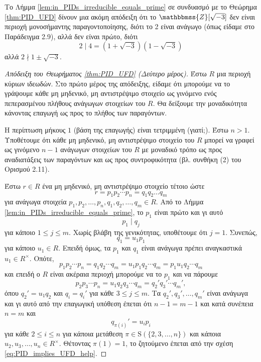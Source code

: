 \documentclass[12pt,a4paper,reqno]{amsart}
\theoremstyle{definition}
\theoremstyle{remark}
\numberwithin{theorem}{section}
\numberwithin{exercise}{section}
\numberwithin{equation}{section}
\newcommand{\ZZ}{\mathbbmss{Z}}
\newcommand{\rmS}{\mathrm{S}}
\begin{document}
Το Λήμμα \ref{lem:in_PIDs_irreducible_equals_prime} σε συνδυασμό με το Θεώρημα \ref{thm:PID_UFD} δίνουν μια ακόμη απόδειξη ότι το $\ZZ[\sqrt{-3}]$ δεν είναι περιοχή μονοσήμαντης παραγοντοποίησης, διότι το 2 είναι ανάγωγο (όπως είδαμε στο Παράδειγμα 2.9), αλλά δεν είναι πρώτο, διότι 
\[
2 \mid 4 = (1 + \sqrt{-3})(1 - \sqrt{-3})
\]
αλλά $2 \nmid 1 \pm \sqrt{-3}$.

\begin{proof}[Απόδειξη του Θεωρήματος \ref{thm:PID_UFD} (Δεύτερο μέρος)] 
    Έστω $R$ μια περιοχή κύριων ιδεωδών. Στο π\-ρώτο μέρος της απόδειξης, είδαμε ότι μπορούμε να το γράψουμε κάθε μη μηδενικό, μη αντιστρέψιμο στοιχείο ως γινόμενο ενός πεπερασμένου πλήθους ανάγωγων στοιχείων του $R$. Θα δείξουμε την μοναδικότητα κάνοντας επαγωγή ως προς το πλήθος των παραγόντων.

    Η περίπτωση μήκους $1$ (βάση της επαγωγής) είναι τετριμμένη (γιατί;). Έστω $n > 1$. Υποθέτουμε ότι κάθε μη μηδενικό, μη αντιστρέψιμο στοιχείο του $R$ μπορεί να γραφεί ως γινόμενο $n-1$ ανάγωγων στοιχείων του $R$ με μοναδικό τρόπο ως προς αναδιατάξεις των παραγόντων και ως προς συντροφικότητα (βλ. συνθήκη (2) του Ορισμού 2.11). 

    Έστω $r \in R$ ένα μη μηδενικό, μη αντιστρέψιμο στοιχείο τέτοιο ώστε 
    \[
    r = p_1p_2 \cdots p_n = q_1q_2\dots q_m
    \]
    για ανάγωγα στοιχεία $p_1, p_2, \dots, p_n, q_1, q_2, \dots, q_m \in R$. Από το Λήμμα \ref{lem:in_PIDs_irreducible_equals_prime}, το $p_1$ είναι πρώτο και γι αυτό 
    \[
    p_1 \mid q_j
    \]
    για κάποιο $1 \le j \le m$. Χωρίς βλάβη της γενικότητας, υποθέτουμε ότι $j = 1$. Συνεπώς, 
    \begin{equation}
        \label{eq:PID_implies_UFD_help}
    q_1 = u_1 p_1
    \end{equation}
    για κάποιο $u_1 \in R$. Επειδή όμως, τα $p_1$ και $q_1$ είναι ανάγωγα πρέπει αναγκαστικά $u_1 \in R^\times$. Οπότε, 
    \[
    p_1p_2\cdots p_n = q_1q_2\cdots q_m = u_1p_1q_2\cdots q_m = p_1u_1q_2\cdots q_m
    \]
    και επειδή ο $R$ είναι ακέραια περιοχή μπορούμε να  το $p_1$ και να πάρουμε 
    \[
    p_2p_3\cdots p_n = u_1q_2q_3\cdots{q_m} = q_2'q_3'\cdots{q_m'},
    \]
    όπου $q_2' = u_1q_2$ και $q_i = q_i'$ για κάθε $3 \le j \le m$. Τα $q_2', q_3', \dots, q_m'$ είναι ανάγωγα και γι αυτό από την επαγωγική υπόθεση έπεται ότι $n-1=m-1$ και κατά συνέπεια $n=m$ και 
    \[
    q_{\pi(i)}' = u_ip_i 
    \]
    για κάθε $2 \le i \le n$ για κάποια μετάθεση $\pi \in \rmS\left(\{2,3,\dots, n\}\right)$ και κάποια $u_2, u_3, \dots, u_n \in R^\times$. Θέτοντας $\pi(1) = 1$, το ζητούμενο έπεται από την σχέση \eqref{eq:PID_implies_UFD_help}.
\end{proof}
\end{document}
